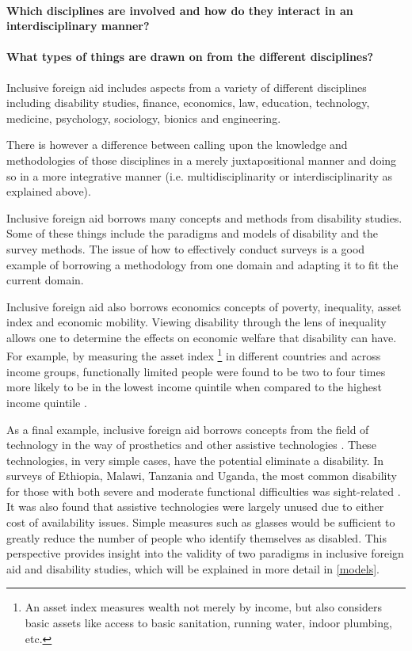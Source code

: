 \documentclass[a4paper]{article}
\begin{document}
\paragraph{Which disciplines are involved and how do they interact in an
interdisciplinary manner?}

\paragraph{What types of things are drawn on from the different disciplines?}

Inclusive foreign aid includes aspects from a variety of different disciplines
including disability studies, finance, economics, law, education, technology,
medicine, psychology, sociology, bionics and engineering. 

There is however a difference between calling upon the knowledge and
methodologies of those disciplines in a merely juxtapositional manner and
doing so in a more integrative manner (i.e. multidisciplinarity or
interdisciplinarity as explained above).

Inclusive foreign aid borrows many concepts and methods from disability
studies. Some of these things include the paradigms and models of disability
and the survey methods. The issue of how to effectively conduct surveys is a
good example of borrowing a methodology from one domain and adapting it to fit
the current domain. 

Inclusive foreign aid also borrows economics concepts of poverty, inequality,
asset index and economic mobility. Viewing disability through the lens of
inequality allows one to determine the effects on economic welfare that
disability can have. For example, by measuring the asset index \footnote{An
asset index measures wealth not merely by income, but also considers basic
assets like access to basic sanitation, running water, indoor plumbing, etc.}
in different countries and across income groups, functionally limited people
were found to be two to four times more likely to be in the lowest income
quintile when compared to the highest income quintile
\citep{mitra2018disability}.  

As a final example, inclusive foreign aid borrows concepts from the field of
technology in the way of prosthetics and other assistive technologies
\cite{roulstone2016disability}. These technologies, in very simple cases, have
the potential eliminate a disability. In surveys of Ethiopia, Malawi, Tanzania
and Uganda, the most common disability for those with both severe and moderate
functional difficulties was sight-related \citep{mitra2018disability}. It was
also found that assistive technologies were largely unused due to either cost
of availability issues. Simple measures such as glasses would be sufficient to
greatly reduce the number of people who identify themselves as disabled.  This
perspective provides insight into the validity of two paradigms in inclusive
foreign aid and disability studies, which will be explained in more detail in
\autoref{models}.
\end{document}

